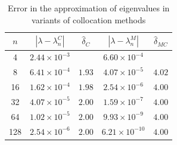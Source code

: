 \documentclass[pdflatex, sn-mathphys-num]{sn-jnl}%
\theoremstyle{thmstyleone}%
\theoremstyle{thmstyletwo}%
\theoremstyle{thmstylethree}%
\begin{document}
\begin{table}[h!]
	\footnotesize
	\centering
	\setlength{\tabcolsep}{8pt}
	\renewcommand{\arraystretch}{1.2}
	\caption{Error in the approximation of eigenvalues in variants of collocation methods}
	\label{table:032}
	\begin{tabular}{|c|c c|c c|}
		\hline
		$n$ & $|\lambda - \lambda_n^C|$ & $\hat\delta_{C}$ & $|\lambda - \lambda_n^M|$ & $\hat\delta_{MC}$ \\[3pt] 
		\hline
		4   & $2.44 \times 10^{-3}$ &            & $6.60 \times 10^{-4}$ &           \\[3pt] 
		8   & $6.41 \times 10^{-4}$ & $1.93$     & $4.07 \times 10^{-5}$ & $4.02$     \\[3pt] 
		16  & $1.62 \times 10^{-4}$ & $1.98$     & $2.54 \times 10^{-6}$ & $4.00$     \\[3pt] 
		32  & $4.07 \times 10^{-5}$ & $2.00$     & $1.59 \times 10^{-7}$ & $4.00$     \\[3pt] 
		64  & $1.02 \times 10^{-5}$ & $2.00$     & $9.93 \times 10^{-9}$ & $4.00$     \\[3pt] 
		128 & $2.54 \times 10^{-6}$ & $2.00$     & $6.21 \times 10^{-10}$ & $4.00$     \\[3pt] 
		\hline
	\end{tabular}
\end{table}
\end{document}
